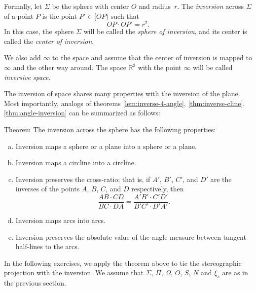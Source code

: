 Formally, let $\Sigma$ be the sphere with center $O$ and radius~$r$.
The \emph{inversion} across $\Sigma$ of a point $P$ is the point $P'\in[OP)$ such that
$$OP\cdot OP'=r^2.$$
In this case, the sphere $\Sigma$  will be called the 
\emph{sphere of inversion},
and its center is called the \emph{center of inversion}.

We also add $\infty$ to the space and assume that the center of inversion is mapped to $\infty$ and the other way around. 
The space $\mathbb{R}^3$ with the point $\infty$ will be called \emph{inversive space}.

The inversion of space shares many properties with the inversion of the plane.
Most importantly, analogs of theorems \ref{lem:inverse-4-angle}, \ref{thm:inverse-cline}, \ref{thm:angle-inversion} can be summarized as follows:

\begin{thm}{Theorem}\label{thm:inversion-3d}
The inversion across the sphere has the following properties:
\begin{enumerate}[(a)]
\item\label{thm:inversion-3d:a} Inversion maps a sphere or a plane into a sphere or a plane.
\item\label{thm:inversion-3d:b} Inversion maps a circline into a circline. 
\item\label{thm:inversion-3d:cross-ratio} Inversion preserves the cross-ratio;
that is, if $A'$, $B'$, $C'$, and $D'$ are the inverses of the points $A$, $B$, $C$, and $D$ respectively,
then
$$\frac{AB\cdot CD}{BC\cdot DA}= \frac{A'B'\cdot C'D'}{B'C'\cdot D'A'}.$$
\item Inversion maps arcs into arcs.
\item\label{thm:inversion-3d:angle}
Inversion preserves the absolute value of the angle
measure between tangent half-lines to the arcs.
\end{enumerate}
\end{thm}

In the following exercises, we apply the theorem above to tie the stereographic projection with the inversion. 
We assume that $\Sigma$, $\Pi$, $\Omega$, $O$, $S$, $N$ and $\xi_s$ are as in the previous section.

